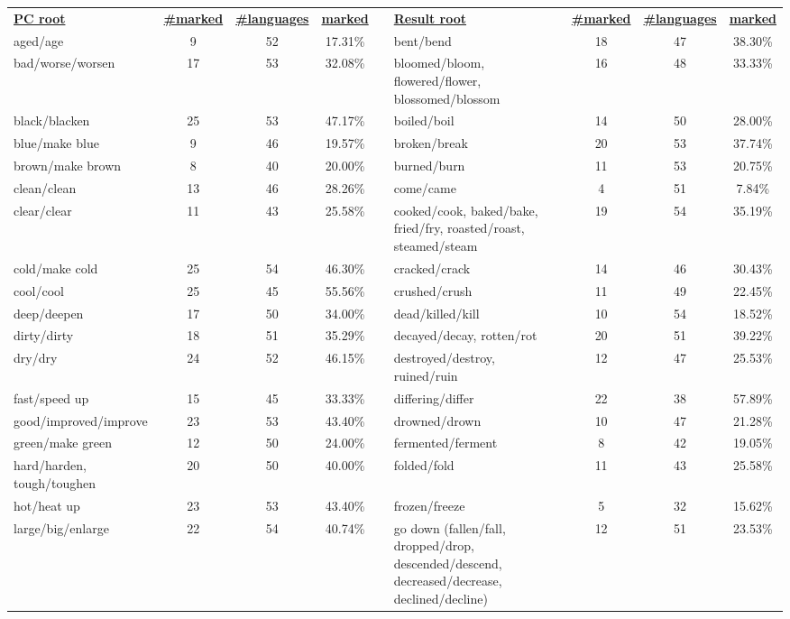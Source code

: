 \begin{tabular}{p{3cm}ccccp{3cm}ccc}
\underline{\textbf{PC root}} & \underline{\textbf{\#marked}} & \underline{\textbf{\#languages}} & \underline{\textbf{marked}} & & \underline{\textbf{Result root}} & \underline{\textbf{\#marked}} & \underline{\textbf{\#languages}} & \underline{\textbf{marked}} \\
aged/age & 9 & 52 & 17.31\% & & bent/bend & 18 & 47 & 38.30\% \\
bad/worse/worsen & 17 & 53 & 32.08\% & & bloomed/bloom, flowered/flower, blossomed/blossom & 16 & 48 & 33.33\% \\
black/blacken & 25 & 53 & 47.17\% & & boiled/boil & 14 & 50 & 28.00\% \\
blue/make blue & 9 & 46 & 19.57\% & & broken/break & 20 & 53 & 37.74\% \\
brown/make brown & 8 & 40 & 20.00\% & & burned/burn & 11 & 53 & 20.75\% \\
clean/clean & 13 & 46 & 28.26\% & & come/came & 4 & 51 & 7.84\% \\
clear/clear & 11 & 43 & 25.58\% & & cooked/cook, baked/bake, fried/fry, roasted/roast, steamed/steam & 19 & 54 & 35.19\% \\
cold/make cold & 25 & 54 & 46.30\% & & cracked/crack & 14 & 46 & 30.43\% \\
cool/cool & 25 & 45 & 55.56\% & & crushed/crush & 11 & 49 & 22.45\% \\
deep/deepen & 17 & 50 & 34.00\% & & dead/killed/kill & 10 & 54 & 18.52\% \\
dirty/dirty & 18 & 51 & 35.29\% & & decayed/decay, rotten/rot & 20 & 51 & 39.22\% \\
dry/dry & 24 & 52 & 46.15\% & & destroyed/destroy, ruined/ruin & 12 & 47 & 25.53\% \\
fast/speed up & 15 & 45 & 33.33\% & & differing/differ & 22 & 38 & 57.89\% \\
good/improved/improve & 23 & 53 & 43.40\% & & drowned/drown & 10 & 47 & 21.28\% \\
green/make green & 12 & 50 & 24.00\% & & fermented/ferment & 8 & 42 & 19.05\% \\
hard/harden, tough/toughen & 20 & 50 & 40.00\% & & folded/fold & 11 & 43 & 25.58\% \\
hot/heat up & 23 & 53 & 43.40\% & & frozen/freeze & 5 & 32 & 15.62\% \\
large/big/enlarge & 22 & 54 & 40.74\% & & go down (fallen/fall, dropped/drop, descended/descend, decreased/decrease, declined/decline) & 12 & 51 & 23.53\% \\

\end{tabular}
